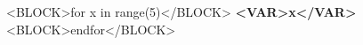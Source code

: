 \documentclass{a4paper, 10pt}
\begin{document}
<BLOCK>for x in range(5)</BLOCK>
  \textbf{<VAR>x</VAR>}\\
<BLOCK>endfor</BLOCK>
\end{document}
